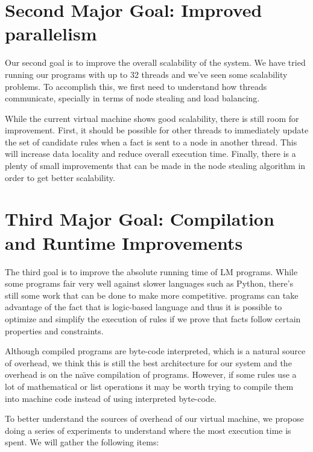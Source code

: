 \section{Second Major Goal: Improved parallelism}

Our second goal is to improve the overall scalability of the system. We have tried running our programs with up to 32 threads and we've seen
some scalability problems. To accomplish this, we first need to understand how
threads communicate, specially in terms of node stealing and load balancing.

While the current virtual machine shows good scalability, there is still room for improvement. First,
it should be possible for other threads to immediately update the set of candidate rules when a fact
is sent to a node in another thread. This will increase data locality and reduce overall execution time.
Finally, there is a plenty of small improvements that can be made in the node stealing algorithm in order to
get better scalability.

\section{Third Major Goal: Compilation and Runtime Improvements}

The third goal is to improve the absolute running time of LM programs. While some programs fair very well against slower languages such as Python,
there's still some work that can be done to make \lang more competitive. \lang programs can take advantage of the fact that
\lang is logic-based language and thus it is possible to optimize and simplify the execution of rules
if we prove that facts follow certain properties and constraints.

Although compiled \lang programs are byte-code interpreted, which is a natural
source of overhead, we think this is still the best architecture for our system and the overhead
is on the na\"{\i}ve compilation of programs. However, 
if some rules use a lot of mathematical or list operations it may be worth trying to compile them into machine code instead of using interpreted byte-code.

To better understand the sources of overhead of our virtual machine, we propose doing a series
of experiments to understand where the most execution time is spent. We will gather the following
items:

